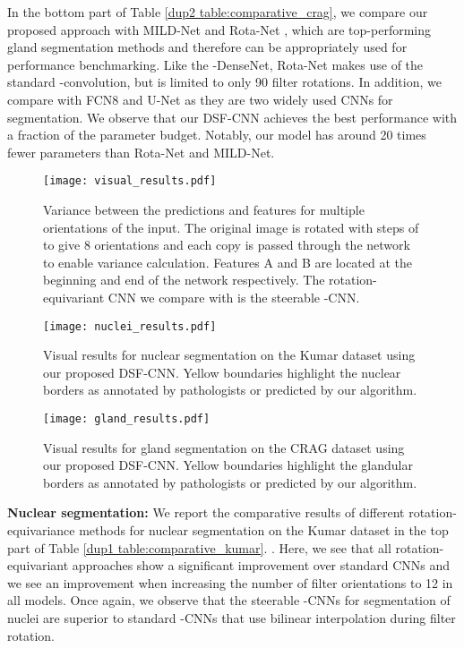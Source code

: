 \documentclass[journal]{IEEEtran}
\newcommand\mg[1]{{\color{black}{#1}}}
\begin{document}
	    In the bottom part of Table \ref{dup2 table:comparative_crag}, we compare our proposed approach with MILD-Net \cite{graham2019mild} and Rota-Net \cite{graham2019rota}, which are top-performing gland segmentation methods and therefore can be appropriately used for performance benchmarking. Like the -DenseNet, Rota-Net makes use of the standard -convolution, but is limited to only 90 filter rotations. In addition, we compare with FCN8 and U-Net as they are two widely used CNNs for segmentation. We observe that our DSF-CNN achieves the best performance with a fraction of the parameter budget. Notably, our model has around 20 times fewer parameters than Rota-Net and MILD-Net.
	    
	    	    	    		\begin{figure*}[t]
		\centering
        \texttt{[image: visual\_results.pdf]}
		\caption{Variance between the predictions and features for multiple orientations of the input. The original image is rotated with steps of  to give 8 orientations and each copy is passed through the network to enable variance calculation. Features A and B are located at the beginning and end of the network respectively. The rotation-equivariant CNN we compare with is the  steerable -CNN.}
		\label{dup1 fig:visual_results}
	\end{figure*}
	    
	    	    \begin{figure*}[t]
		\centering
        \texttt{[image: nuclei\_results.pdf]}
		\caption{Visual results for nuclear segmentation on the Kumar dataset \cite{kumar2017dataset} using our proposed DSF-CNN. Yellow boundaries highlight the nuclear borders as annotated by pathologists or predicted by our algorithm.}
		\label{fig:visual_results_nuclei}
	\end{figure*}
	

	  \begin{figure*}[t]
		\centering
        \texttt{[image: gland\_results.pdf]}
		\caption{Visual results for gland segmentation on the CRAG dataset \cite{graham2019mild} using our proposed DSF-CNN. Yellow boundaries highlight the glandular borders as annotated by pathologists or predicted by our algorithm.}
		\label{fig:visual_results_gland}
	\end{figure*}
	    
	
	    \textbf{Nuclear segmentation: }We report the comparative results of different rotation-equivariance methods for nuclear segmentation on the Kumar dataset in the top part of Table \ref{dup1 table:comparative_kumar}. \mg{Similar to above, we compare conventional CNNs with both standard and steerable -CNNs}. Here, we see that all rotation-equivariant approaches show a significant improvement over standard CNNs and we see an improvement when increasing the number of filter orientations to 12 in all models. Once again, we observe that the steerable -CNNs for segmentation of nuclei are superior to standard -CNNs that use bilinear interpolation during filter rotation.
	    
\end{document}
